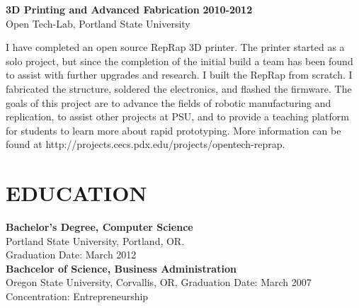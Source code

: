 \documentclass[overlapped]{res}
\begin{document}
\begin{resume}
\begin{itemize}[leftmargin=0in]
\begin{itemize}[leftmargin=0in]
\begin{samepage}
                    \textbf{3D Printing and Advanced Fabrication} \hfill \textbf{2010-2012} \\
                    Open Tech-Lab, Portland State University

                    I have completed an open source RepRap 3D printer. The printer started as a solo project, 
                    but since the completion of the initial build a team has been found to assist with further 
                    upgrades and research.  I built the RepRap from scratch.  I fabricated the structure, soldered  
                    the electronics, and flashed the firmware. 	The goals of this project are to advance the 
                    fields of robotic manufacturing and replication, to assist other projects at PSU, and to 
                    provide a teaching platform for students to learn more about rapid prototyping. 
                    More information can be found at http://projects.cecs.pdx.edu/projects/opentech-reprap. 
                \end{samepage}
        \end{itemize}
\end{itemize}
	
\section{EDUCATION} 
\begin{multicols}{2}
    \textbf{Bachelor's Degree, Computer Science} \\
    Portland State University, Portland, OR. \\
    Graduation Date: March 2012 \\
    \columnbreak
    \textbf{Bachcelor of Science, Business Administration} \\
    Oregon State University, Corvallis, OR, 
    Graduation Date: March 2007 \\
    Concentration: Entrepreneurship
\end{multicols}


\end{resume}
\end{document}
